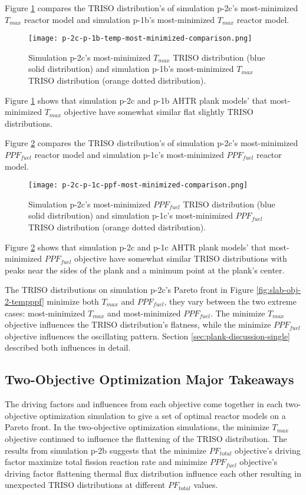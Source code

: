 Figure \ref{fig:p-2c-temp-triso-comparison} compares the TRISO distribution's of 
simulation p-2c's most-minimized $T_{max}$ reactor model and simulation p-1b's 
most-minimized $T_{max}$ reactor model. 
\begin{figure}[htbp!]
    \centering
    \texttt{[image: p-2c-p-1b-temp-most-minimized-comparison.png]} 
    \caption{Simulation p-2c's most-minimized $T_{max}$ TRISO distribution (blue 
    solid distribution) and simulation p-1b's most-minimized $T_{max}$ TRISO 
    distribution (orange dotted distribution).}
    \label{fig:p-2c-temp-triso-comparison}
\end{figure}
Figure \ref{fig:p-2c-temp-triso-comparison} shows that simulation p-2c and 
p-1b AHTR plank models' that most-minimized $T_{max}$ objective have 
somewhat similar flat slightly TRISO distributions.  

Figure \ref{fig:p-2c-ppf-triso-comparison} compares the TRISO distribution's of 
simulation p-2c's most-minimized $PPF_{fuel}$ reactor model and simulation p-1c's 
most-minimized $PPF_{fuel}$ reactor model. 
\begin{figure}[htbp!]
    \centering
    \texttt{[image: p-2c-p-1c-ppf-most-minimized-comparison.png]} 
    \caption{Simulation p-2c's most-minimized $PPF_{fuel}$ TRISO distribution (blue 
    solid distribution) and simulation p-1c's most-minimized $PPF_{fuel}$ TRISO 
    distribution (orange dotted distribution).}
    \label{fig:p-2c-ppf-triso-comparison}
\end{figure}
Figure \ref{fig:p-2c-ppf-triso-comparison} shows that simulation p-2c and 
p-1c AHTR plank models' that most-minimized $PPF_{fuel}$ objective have 
somewhat similar TRISO distributions with peaks near the sides of the plank and a 
minimum point at the plank's center. 

The \gls{TRISO} distributions on simulation p-2c's Pareto front in Figure 
\ref{fig:slab-obj-2-tempppf} minimize both $T_{max}$ and $PPF_{fuel}$, they vary 
between the two extreme cases: most-minimized $T_{max}$ and most-minimized 
$PPF_{fuel}$. 
The minimize $T_{max}$ objective influences the TRISO distribution's flatness, while 
the minimize $PPF_{fuel}$ objective influences the oscillating pattern.
Section \ref{sec:plank-discussion-single} described both influences in detail. 

\subsection{Two-Objective Optimization Major Takeaways}
The driving factors and influences from each objective come together in 
each two-objective optimization simulation to give a set of optimal reactor models 
on a Pareto front. 
In the two-objective optimization simulations, the minimize $T_{max}$ objective 
continued to influence the flattening of the TRISO distribution. 
The results from simulation p-2b suggests that the minimize $PF_{total}$ 
objective's driving factor maximize total fission reaction rate and 
minimize $PPF_{fuel}$ objective's driving factor flattening thermal flux distribution 
influence each other resulting in unexpected TRISO distributions at different 
$PF_{total}$ values. 

